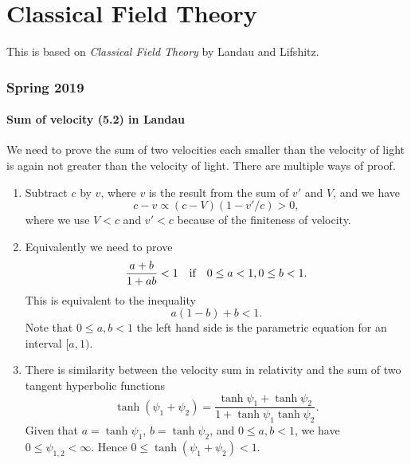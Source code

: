 \documentclass[10pt]{article}
\begin{document}
\part{Classical Field Theory}
This is based on \textit{Classical Field Theory} by Landau and Lifshitz.
\section{Spring 2019}

\subsection{Sum of velocity (5.2) in Landau}
We need to prove the sum of two velocities each smaller than the velocity of light is again not greater than the velocity of light. There are multiple ways of proof.
\begin{enumerate}
	\item Subtract $c$ by $v$, where $v$ is the result from the sum of $v'$ and $V$, and we have
	\begin{equation}
		c - v \propto (c-V)(1-v'/c) >0,
	\end{equation}
	where we use $V<c$ and $v'<c$ because of the finiteness of velocity.
	\item Equivalently we need to prove
	\begin{equation}
		\frac{a+b}{1+ab} <1\qif 0 \le a<1, 0 \le b<1.
	\end{equation}
	This is equivalent to the inequality
	\begin{equation}
		a(1-b) + b <1.
	\end{equation}
	Note that $0 \le a, b<1$ the left hand side is the parametric equation for an interval $[a,1)$.
	\item There is similarity between the velocity sum in relativity and the sum of two tangent hyperbolic functions
	\begin{equation}
		\tanh{(\psi_1 + \psi_2)} = \frac{\tanh{\psi_1} + \tanh{\psi_2}}{1 + \tanh{\psi_1} \tanh{\psi_2}}.
	\end{equation}
	Given that $a = \tanh{\psi_1}$, $b = \tanh{\psi_2}$, and $0 \le a,b <1$, we have $0 \le \psi_{1,2} < \infty$. Hence $0 \le \tanh{(\psi_1 + \psi_2)} <1$.
	\end{enumerate}
\end{document}
